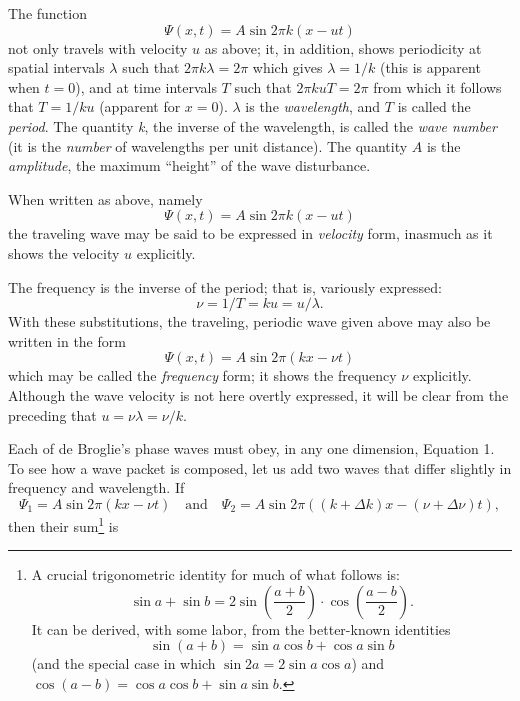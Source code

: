 The function
\begin{equation*}
\Psi(x,t) = A \sin 2\pi k(x-ut)
\end{equation*}
not only travels with velocity $u$ as above; it, in addition, shows
periodicity at spatial intervals $\lambda$ such that $2\pi k\lambda = 2\pi$ 
which gives $\lambda = 1/k$ (this is apparent when
$t = 0$), and at time intervals $T$ such that $2\pi kuT = 2\pi$ 
from which it follows that $T = 1/ku$ (apparent
for $x = 0$). $\lambda$ is the \emph{wavelength}, and $T$ is
called the \emph{period}. The quantity \emph{k}, the inverse of
the wavelength, is called the \emph{wave number} (it is the
\emph{number} of wavelengths per unit distance). The quantity $A$
is the \emph{amplitude}, the maximum ``height'' of the wave disturbance.

When written as above, namely
\begin{equation*}
\Psi(x,t) = A \sin 2\pi k(x-ut)
\end{equation*}
the traveling wave may be said to be expressed in \emph{velocity} form,
inasmuch as it shows the velocity $u$ explicitly.

The frequency is the inverse of the period; that is, variously
expressed:
\begin{equation*}
\nu = 1/T = ku = u/\lambda .
\end{equation*}
With these substitutions, the traveling, periodic wave given above may
also be written in the form
\begin{equation*}\tag{1}
\Psi(x,t) = A \sin 2\pi(kx-\nu t)
\end{equation*}
which may be called the \emph{frequency} form; it shows the frequency
$\nu$ explicitly. Although the wave velocity is not here overtly
expressed, it will be clear from the preceding that $u = \nu\lambda = \nu/k$.

Each of de Broglie's phase waves must obey, in any one dimension,
Equation 1. To see how a wave packet is composed, let us add two waves
that differ slightly in frequency and wavelength. If
\begin{equation*}
\Psi_1  = A\sin 2\pi(kx-\nu t)\quad\text{and}\quad\Psi_2 = 
A\sin 2\pi((k+\Delta k)x - (\nu + \Delta\nu)t),
\end{equation*}
then their sum\footnote{A crucial trigonometric identity for much of
  what follows is: 
  \begin{equation*}
  \sin a + \sin b = 2 \sin\left(\frac{a+b}{2}\right)\cdot\cos\left(\frac{a-b}{2}\right) .
  \end{equation*}
  It can be derived, with some labor, from the better-known identities
  \begin{equation*}
  \sin{(a+b)} = \sin a\cos b + \cos a\sin b
  \end{equation*}
  (and the special case in which $\sin{2a} = 2\sin{a}\cos{a}$) and
  $\cos{(a-b)} = \cos{a}\cos{b} + \sin{a}\sin{b}$.} is


